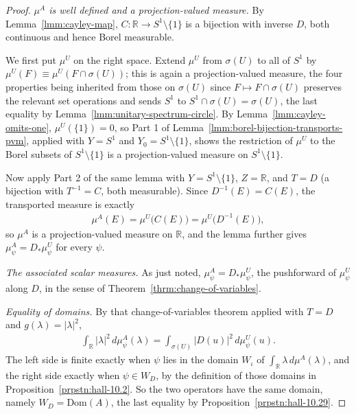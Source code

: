 \begin{proof}
    \leanok
\textit{$\mu^A$ is well defined and a projection-valued measure.} By Lemma~\ref{lmm:cayley-map}, $C : \mathbb{R} \to S^1\setminus\{1\}$ is a bijection with inverse $D$, both continuous and hence Borel measurable.

We first put $\mu^U$ on the right space. Extend $\mu^U$ from $\sigma(U)$ to all of $S^1$ by $\mu^U(F) \equiv \mu^U(F \cap \sigma(U))$; this is again a projection-valued measure, the four properties being inherited from those on $\sigma(U)$ since $F \mapsto F\cap\sigma(U)$ preserves the relevant set operations and sends $S^1$ to $S^1 \cap \sigma(U) = \sigma(U)$, the last equality by Lemma~\ref{lmm:unitary-spectrum-circle}. By Lemma~\ref{lmm:cayley-omits-one}, $\mu^U(\{1\}) = 0$, so Part 1 of Lemma~\ref{lmm:borel-bijection-transports-pvm}, applied with $Y = S^1$ and $Y_0 = S^1\setminus\{1\}$, shows the restriction of $\mu^U$ to the Borel subsets of $S^1\setminus\{1\}$ is a projection-valued measure on $S^1\setminus\{1\}$.

Now apply Part 2 of the same lemma with $Y = S^1\setminus\{1\}$, $Z = \mathbb{R}$, and $T = D$ (a bijection with $T^{-1} = C$, both measurable). Since $D^{-1}(E) = C(E)$, the transported measure is exactly
\begin{align}
    \mu^A(E) = \mu^U\big( C(E) \big) = \mu^U\big( D^{-1}(E) \big),
\end{align}
so $\mu^A$ is a projection-valued measure on $\mathbb{R}$, and the lemma further gives $\mu^A_\psi = D_*\mu^U_\psi$ for every $\psi$.

\textit{The associated scalar measures.} As just noted, $\mu^A_\psi = D_*\mu^U_\psi$, the pushforward of $\mu^U_\psi$ along $D$, in the sense of Theorem~\ref{thrm:change-of-variables}.

\textit{Equality of domains.} By that change-of-variables theorem applied with $T = D$ and $g(\lambda) = \lvert \lambda \rvert^2$,
\begin{align}
    \int_{\mathbb{R}} \lvert \lambda \rvert^2 \, d\mu^A_\psi(\lambda) = \int_{\sigma(U)} \lvert D(u) \rvert^2 \, d\mu^U_\psi(u).
\end{align}
The left side is finite exactly when $\psi$ lies in the domain $W_\iota$ of $\int_{\mathbb{R}}\lambda\,d\mu^A(\lambda)$, and the right side exactly when $\psi \in W_D$, by the definition of those domains in Proposition~\ref{prpstn:hall-10.2}. So the two operators have the same domain, namely $W_D = \text{Dom}(A)$, the last equality by Proposition~\ref{prpstn:hall-10.29}.


\end{proof}
